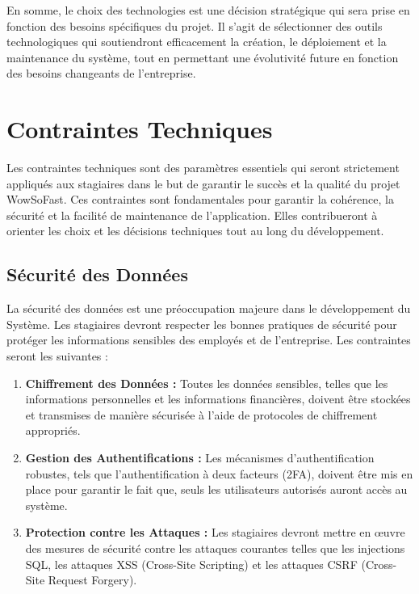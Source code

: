 \vspace{0.5cm}

En somme, le choix des technologies est une décision stratégique qui sera prise en fonction des besoins spécifiques du projet. Il s'agit de sélectionner des outils technologiques qui soutiendront efficacement la création, le déploiement et la maintenance du système, tout en permettant une évolutivité future en fonction des besoins changeants de l'entreprise.

\section{Contraintes Techniques}
Les contraintes techniques sont des paramètres essentiels qui seront strictement appliqués aux stagiaires dans le but de garantir le succès et la qualité du projet WowSoFast. Ces contraintes sont fondamentales pour garantir la cohérence, la sécurité et la facilité de maintenance de l'application. Elles contribueront à orienter les choix et les décisions techniques tout au long du développement.

\subsection{Sécurité des Données}
La sécurité des données est une préoccupation majeure dans le développement du Système. Les stagiaires devront respecter les bonnes pratiques de sécurité pour protéger les informations sensibles des employés et de l'entreprise. Les contraintes seront les suivantes :

\begin{enumerate}
    \item \textbf{Chiffrement des Données :} Toutes les données sensibles, telles que les informations personnelles et les informations financières, doivent être stockées et transmises de manière sécurisée à l'aide de protocoles de chiffrement appropriés.
    \item \textbf{Gestion des Authentifications :} Les mécanismes d'authentification robustes, tels que l'authentification à deux facteurs (2FA), doivent être mis en place pour garantir le fait que, seuls les utilisateurs autorisés auront accès au système.
    \item \textbf{Protection contre les Attaques :} Les stagiaires devront mettre en œuvre des mesures de sécurité contre les attaques courantes telles que les injections SQL, les attaques XSS (Cross-Site Scripting) et les attaques CSRF (Cross-Site Request Forgery).
\end{enumerate}


